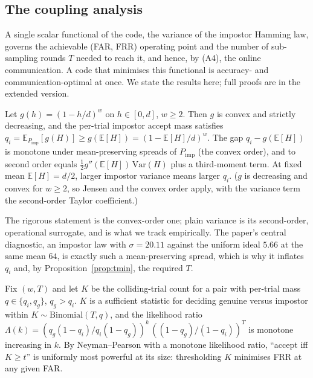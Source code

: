 \subsection{The coupling analysis}
\label{sec:coupling}

A single scalar functional of the code, the variance of the impostor Hamming law, governs the
achievable (FAR, FRR) operating point and the number of sub-sampling rounds $T$ needed to reach it,
and hence, by (A4), the online communication. A code that minimises this functional is accuracy- and
communication-optimal at once. We state the results here; full proofs are in the extended version.

\begin{lemma}
\label{lem:jensen}
Let $g(h) = (1-h/d)^w$ on $h \in [0,d]$, $w \ge 2$. Then $g$ is convex and strictly decreasing, and
the per-trial impostor accept mass satisfies
$q_i = \mathbb{E}_{P_{\mathrm{imp}}}[g(H)] \ge g(\mathbb{E}[H]) = (1-\mathbb{E}[H]/d)^{w}$. The gap
$q_i - g(\mathbb{E}[H])$ is monotone under mean-preserving spreads of $P_{\mathrm{imp}}$ (the convex
order), and to second order equals $\tfrac12 g''(\mathbb{E}[H])\,\mathrm{Var}(H)$ plus a third-moment
term. At fixed mean $\mathbb{E}[H]=d/2$, larger impostor variance means larger $q_i$. ($g$ is decreasing and
convex for $w\ge2$, so Jensen and the convex order apply, with the variance term the second-order
Taylor coefficient.)
\end{lemma}

The rigorous statement is the convex-order one; plain variance is its second-order, operational
surrogate, and is what we track empirically. The paper's central diagnostic, an impostor law with
$\sigma = 20.11$ against the uniform ideal $5.66$ at the same mean $64$, is exactly such a
mean-preserving spread, which is why it inflates $q_i$ and, by Proposition~\ref{prop:tmin}, the
required $T$.

\begin{proposition}
\label{prop:np}
Fix $(w,T)$ and let $K$ be the colliding-trial count for a pair with per-trial mass
$q \in \{q_i, q_g\}$, $q_g > q_i$. $K$ is a sufficient statistic for deciding genuine versus impostor
within $K \sim \mathrm{Binomial}(T,q)$, and the likelihood ratio
$\Lambda(k) = (q_g(1-q_i)/q_i(1-q_g))^{k}\,((1-q_g)/(1-q_i))^{T}$ is monotone increasing in $k$. By
Neyman--Pearson with a monotone likelihood ratio, ``accept iff $K \ge t$'' is uniformly most powerful
at its size: thresholding $K$ minimises FRR at any given FAR.
\end{proposition}

